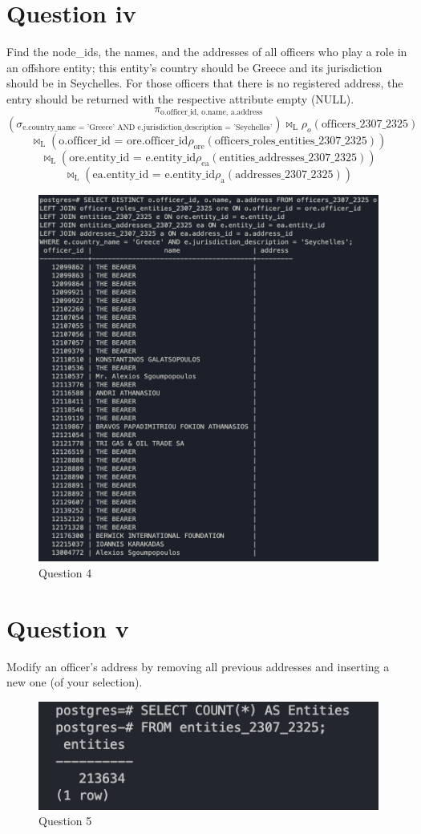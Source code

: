\documentclass{article}
\begin{document}
\section*{Question iv}
Find the node\_ids, the names, and the addresses of all officers who play a role in an offshore entity; this entity’s country should be Greece and its jurisdiction should be in Seychelles. For those officers that there is no registered address, the entry should be returned with the respective attribute empty (NULL).
\[
    \pi_{\text{o.officer\_id, o.name, a.address}}
\]
\[
    (\sigma_{\text{e.country\_name = 'Greece' AND e.jurisdiction\_description = 'Seychelles'}}) \bowtie_{\text{L}}\rho_o(\text{{officers\_2307\_2325}})
\]
\[
    \bowtie_{\text{L}}({\text{o.officer\_id = ore.officer\_id}} \rho_{\text{ore}}(\text{officers\_roles\_entities\_2307\_2325}))
\]
\[
    \bowtie_{\text{L}}({\text{ore.entity\_id = e.entity\_id}}
    \rho_{\text{ea}}(\text{entities\_addresses\_2307\_2325}))
\]
\[
    \bowtie_{\text{L}}({\text{ea.entity\_id = e.entity\_id}} \rho_{\text{a}}(\text{addresses\_2307\_2325}))
\]
\begin{figure}[h]
    \centering
    \includegraphics[width=0.9\linewidth]{Q4.png}
    \captionsetup{labelformat=empty}
    \caption{Question 4}
\end{figure}



\newpage
\section*{Question v}
Modify an officer’s address by removing all previous addresses and inserting a new one (of your selection).

\begin{figure}[h]
    \centering
    \includegraphics[width=0.9\linewidth]{Q1.png}
    \captionsetup{labelformat=empty}
    \caption{Question 5}
\end{figure}
\end{document}
